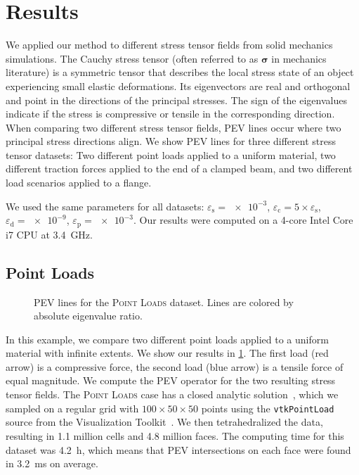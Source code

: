 \section{Results} %
\label{sec:pev_results}
%
We applied our method to different stress tensor fields from solid mechanics
simulations.
%
The Cauchy stress tensor (often referred to as $\mathbf{\sigma}$ in mechanics
literature) is a symmetric tensor that describes the local stress state of an
object experiencing small elastic deformations.
%
Its eigenvectors are real and orthogonal and point in the directions of the
principal stresses.
%
The sign of the eigenvalues indicate if the stress is compressive or tensile in
the corresponding direction.
%
When comparing two different stress tensor fields, \ac{PEV} lines occur where
two principal stress directions align.
%
We show \ac{PEV} lines for three different stress tensor datasets:
%
Two different point loads applied to a uniform material, two different traction
forces applied to the end of a clamped beam, and two different load scenarios
applied to a flange.
%

%
We used the same parameters for all datasets:
%
$\varepsilon_\mathrm{s} = \num{e-3}$, $\varepsilon_\mathrm{c} = 5 \times
\varepsilon_\mathrm{s}$, $\varepsilon_\mathrm{d} = \num{e-9}$,
$\varepsilon_\mathrm{p} = \num{e-3}$.
%
Our results were computed on a 4-core Intel Core i7 \ac{CPU} at
\SI{3.4}{\giga\hertz}.
%
\subsection{Point Loads} %
\label{ssub:point_loads}
%
\begin{figure}[t]
    \setlength\figurewidth\textwidth
    \centering
    
    \caption{\ac{PEV} lines for the \textsc{Point Loads} dataset. Lines are
             colored by absolute eigenvalue ratio.}
    \label{fig:point_load}
\end{figure}
%
In this example, we compare two different point loads applied to a uniform
material with infinite extents.
%
We show our results in \cref{fig:point_load}.
%
The first load (red arrow) is a compressive force, the second load (blue arrow)
is a tensile force of equal magnitude.
%
We compute the \ac{PEV} operator for the two resulting stress tensor fields.
%
The \textsc{Point Loads} case has a closed analytic solution~\cite{Saada2013},
which we sampled on a regular grid with $\num{100} \times \num{50} \times
\num{50}$ points using the \texttt{vtkPointLoad} source from the Visualization
Toolkit~\cite{Schroeder2006}.
%
We then tetrahedralized the data, resulting in \num{1.1} million cells and
\num{4.8} million faces.
%
The computing time for this dataset was \SI{4.2}{\hour}, which means that
\ac{PEV} intersections on each face were found in \SI{3.2}{\milli\second} on
average.
%

